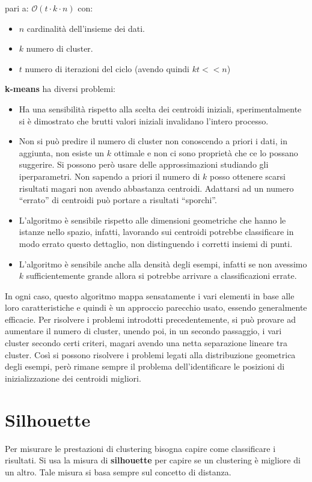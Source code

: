 pari a: $\mathcal{O}(t \cdot k \cdot n)$ con:
\begin{itemize}
      \item $n$ cardinalità dell'insieme dei dati.
      \item $k$ numero di cluster.
      \item $t$ numero di iterazioni del ciclo (avendo quindi $kt << n$)
\end{itemize}
\textbf{k-means} ha diversi problemi:
\begin{itemize}
      \item Ha una sensibilità rispetto alla scelta dei centroidi iniziali,
            sperimentalmente si è dimostrato che brutti valori iniziali
            invalidano l'intero processo.
      \item Non si può predire il numero di cluster non conoscendo a priori i
            dati, in aggiunta, non esiste un $k$ ottimale e non ci sono proprietà
            che ce lo possano suggerire. Si possono però usare delle
            approssimazioni studiando gli iperparametri. Non sapendo a priori il
            numero di $k$ posso ottenere scarsi risultati magari non avendo
            abbastanza centroidi. Adattarsi ad un numero “errato” di centroidi
            può portare a risultati “sporchi”.
      \item L'algoritmo è sensibile rispetto alle dimensioni geometriche che
            hanno le istanze nello spazio, infatti, lavorando sui centroidi
            potrebbe classificare in modo errato questo dettaglio, non
            distinguendo i corretti insiemi di punti.
      \item L'algoritmo è sensibile anche alla densità degli esempi, infatti se
            non avessimo $k$ sufficientemente grande allora si potrebbe arrivare
            a classificazioni errate.
\end{itemize}
In ogni caso, questo algoritmo mappa sensatamente i vari elementi in base alle
loro caratteristiche e quindi è un approccio parecchio usato, essendo generalmente
efficacie. Per risolvere i problemi introdotti precedentemente, si può provare
ad aumentare il numero di cluster, unendo poi, in un secondo passaggio, i vari
cluster secondo certi criteri, magari avendo una netta separazione lineare tra
cluster. Così si possono risolvere i problemi legati alla distribuzione geometrica
degli esempi, però rimane sempre il problema dell'identificare le posizioni di
inizializzazione dei centroidi migliori.
\section{Silhouette}
Per misurare le prestazioni di clustering bisogna capire come classificare i
risultati. Si usa la misura di \textbf{silhouette} per capire se un clustering è
migliore di un altro. Tale misura si basa sempre sul concetto di distanza.

